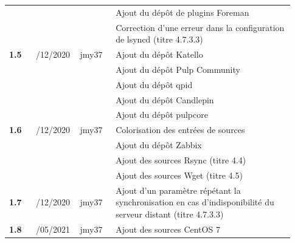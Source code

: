 \documentclass[a4paper, oneside, 12pt, final, headsepline, footsepline]{scrartcl}
\begin{document}
\begin{table}[H]
\begin{tabular}{|>{\centering\arraybackslash}p{0.09\linewidth}|>{\centering\arraybackslash}p{0.12\linewidth}|>{\raggedright\arraybackslash}p{0.12\linewidth}|>{\raggedright\arraybackslash}p{0.6\linewidth}|}
                         &               &                 & Ajout du dépôt de plugins Foreman                                                                            \\
                         &               &                 & Correction d'une erreur dans la configuration de lsyncd (titre 4.7.3.3)                                      \\ \hline
        \textbf{1.5}     & 04/12/2020    & jmy37           & Ajout du dépôt Katello                                                                                       \\
                         &               &                 & Ajout du dépôt Pulp Community                                                                                \\
                         &               &                 & Ajout du dépôt qpid                                                                                          \\
                         &               &                 & Ajout du dépôt Candlepin                                                                                     \\
                         &               &                 & Ajout du dépôt pulpcore                                                                                      \\ \hline
        \textbf{1.6}     & 10/12/2020    & jmy37           & Colorisation des entrées de sources                                                                          \\
                         &               &                 & Ajout du dépôt Zabbix                                                                                        \\
                         &               &                 & Ajout des sources Rsync (titre 4.4)                                                                          \\
                         &               &                 & Ajout des sources Wget (titre 4.5)                                                                           \\ \hline
        \textbf{1.7}     & 17/12/2020    & jmy37           & Ajout d'un paramètre répétant la synchronisation en cas d'indisponibilité du serveur distant (titre 4.7.3.3) \\ \hline
        \textbf{1.8}     & 06/05/2021    & jmy37           & Ajout des sources CentOS 7                                                                                   \\

\end{tabular}
\end{table}
\end{document}
